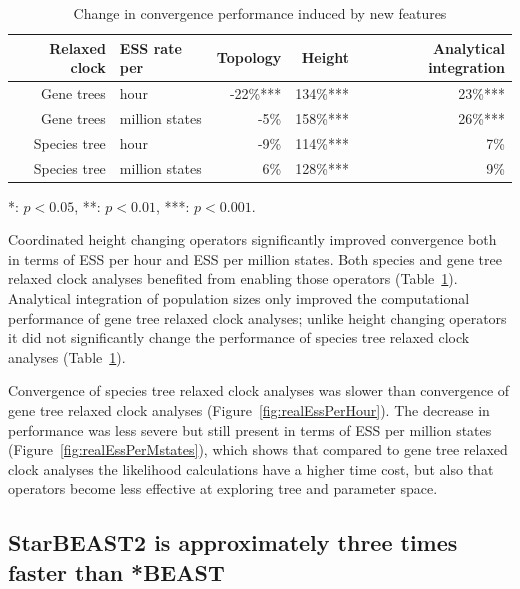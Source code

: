 \documentclass[nogrid]{MBE}%
\begin{document}
\begin{table}[htb!]
\caption{Change in convergence performance induced by new features}
\label{tab:convergenceLM}
\begin{threeparttable}
\begin{tabular*}{\textwidth}{@{\extracolsep{\fill}}rlrrr@{}}
\hline
Relaxed clock & ESS rate per & Topology & Height & Analytical integration\tabularnewline
\hline
Gene trees & hour & -22\%{***} & 134\%{***} & 23\%{***}\tabularnewline
Gene trees & million states & -5\%\hphantom{***} & 158\%{***} & 26\%{***}\tabularnewline
Species tree & hour & -9\%\hphantom{***} & 114\%{***} & 7\%\hphantom{***}\tabularnewline
Species tree & million states & 6\%\hphantom{***} & 128\%{***} & 9\%\hphantom{***}\tabularnewline
\hline
\end{tabular*}
\begin{tablenotes}
\item {*}: $p < 0.05$, {**}: $p < 0.01$, {***}: $p < 0.001$.
\end{tablenotes}
\end{threeparttable}
\end{table}

Coordinated height changing operators significantly improved convergence both in
terms of ESS per hour and ESS per million states. Both species and gene
tree relaxed clock analyses benefited from enabling those operators
(Table~\ref{tab:convergenceLM}). Analytical integration of population sizes only
improved the computational performance of gene tree relaxed clock analyses;
unlike height changing operators it did not significantly change the performance
of species tree relaxed clock analyses (Table~\ref{tab:convergenceLM}).

Convergence of species tree relaxed clock analyses was slower than convergence
of gene tree relaxed clock analyses (Figure~\ref{fig:realEssPerHour}). The
decrease in performance was less severe but still present in terms of ESS per
million states (Figure~\ref{fig:realEssPerMstates}), which shows that compared
to gene tree relaxed clock analyses the likelihood calculations have a higher
time cost, but also that operators become less effective at exploring tree and
parameter space.

\subsection{StarBEAST2 is approximately three times faster than *BEAST}
\end{document}
